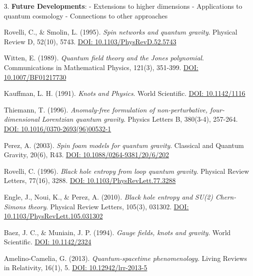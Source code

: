 \documentclass[12pt,a4paper]{article}
\begin{document}
3. \textbf{Future Developments}:
   - Extensions to higher dimensions
   - Applications to quantum cosmology
   - Connections to other approaches

\begin{thebibliography}{99}

Rovelli, C., \& Smolin, L. (1995).
\textit{Spin networks and quantum gravity}.
Physical Review D, 52(10), 5743.
\href{https://doi.org/10.1103/PhysRevD.52.5743}{DOI: 10.1103/PhysRevD.52.5743}

Witten, E. (1989).
\textit{Quantum field theory and the Jones polynomial}.
Communications in Mathematical Physics, 121(3), 351-399.
\href{https://doi.org/10.1007/BF01217730}{DOI: 10.1007/BF01217730}

Kauffman, L. H. (1991).
\textit{Knots and Physics}.
World Scientific.
\href{https://doi.org/10.1142/1116}{DOI: 10.1142/1116}

Thiemann, T. (1996).
\textit{Anomaly-free formulation of non-perturbative, four-dimensional Lorentzian quantum gravity}.
Physics Letters B, 380(3-4), 257-264.
\href{https://doi.org/10.1016/0370-2693(96)00532-1}{DOI: 10.1016/0370-2693(96)00532-1}

Perez, A. (2003).
\textit{Spin foam models for quantum gravity}.
Classical and Quantum Gravity, 20(6), R43.
\href{https://doi.org/10.1088/0264-9381/20/6/202}{DOI: 10.1088/0264-9381/20/6/202}

Rovelli, C. (1996).
\textit{Black hole entropy from loop quantum gravity}.
Physical Review Letters, 77(16), 3288.
\href{https://doi.org/10.1103/PhysRevLett.77.3288}{DOI: 10.1103/PhysRevLett.77.3288}

Engle, J., Noui, K., \& Perez, A. (2010).
\textit{Black hole entropy and SU(2) Chern-Simons theory}.
Physical Review Letters, 105(3), 031302.
\href{https://doi.org/10.1103/PhysRevLett.105.031302}{DOI: 10.1103/PhysRevLett.105.031302}

Baez, J. C., \& Muniain, J. P. (1994).
\textit{Gauge fields, knots and gravity}.
World Scientific.
\href{https://doi.org/10.1142/2324}{DOI: 10.1142/2324}

Amelino-Camelia, G. (2013).
\textit{Quantum-spacetime phenomenology}.
Living Reviews in Relativity, 16(1), 5.
\href{https://doi.org/10.12942/lrr-2013-5}{DOI: 10.12942/lrr-2013-5}

\end{thebibliography}
\end{document}
